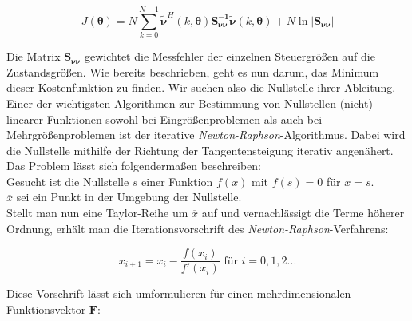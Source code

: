 \begin{equation}
    J(\mathbf{\theta})=N 
    \sum\limits_{k=0}^{N-1}\mathbf{\tilde{\nu}}^H(k,\mathbf{\theta})\mathbf{S_{\nu\nu}^{-1}}\mathbf{\tilde{\nu}}(k,\mathbf{\theta})+N
     \ln{\left|\mathbf{S_{\nu\nu}}\right|}
	\label{eq:Kostenfunktion}
\end{equation}  

Die Matrix $\mathbf{S_{\nu\nu}}$ gewichtet die Messfehler der einzelnen Steuergrößen auf die Zustandsgrößen. 
Wie bereits beschrieben, geht es nun darum, das Minimum dieser Kostenfunktion zu finden. Wir suchen also die Nullstelle ihrer 
Ableitung. Einer der wichtigsten Algorithmen zur Bestimmung von Nullstellen (nicht)-linearer Funktionen sowohl bei 
Eingrößenproblemen als auch bei Mehrgrößenproblemen ist der iterative \textit{Newton-Raphson}-Algorithmus. Dabei wird die 
Nullstelle 
mithilfe der Richtung der Tangentensteigung iterativ angenähert. Das Problem lässt sich folgendermaßen beschreiben: \noindent 
\\

\noindent \tab Gesucht ist die Nullstelle $ s $ einer Funktion $f(x)$ mit $f(s)=0$ für $x=s$. \\
\tab $\overline{x}$ sei ein Punkt in der Umgebung der Nullstelle.\\

Stellt man nun eine Taylor-Reihe um $\overline{x}$ auf und vernachlässigt die Terme höherer Ordnung, erhält man die 
Iterationsvorschrift des \textit{Newton-Raphson}-Verfahrens:

 \begin{equation}
	x_{i+1} = x_{i} - \frac{f(x_{i})}{f'(x_{i})} \text{ für }i=0,1,2...
	\label{eq:Newton_Raphson}
\end{equation}  

Diese Vorschrift lässt sich umformulieren für einen mehrdimensionalen Funktionsvektor $\mathbf{F}$:

